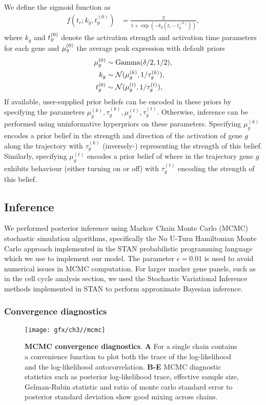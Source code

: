 We define the sigmoid function as
\begin{align}
	f(t_c;k_g,t^{(0)}_g) &= \frac{2}{1 + \exp\left(-k_g(t_c - t^{(0)}_g)\right)},
\end{align}
where $k_g$ and $t^{(0)}_g$ denote the activation strength and activation time parameters for each gene and $\mu^{(0)}_g$ the average peak expression
with default priors
\begin{align}
		\mu^{(0)}_g & \sim \mathrm{Gamma}(\delta / 2, 1 / 2), \\
		k_g & \sim \mathcal{N}(\mu^{(k)}_g, 1 / \tau^{(k)}_g), \\
		t^{(0)}_g & \sim \mathcal{N}(\mu^{(t)}_g, 1 / \tau^{(t)}_g),
\end{align}
If available, user-supplied prior beliefs can be encoded in these priors by specifying the parameters $\mu^{(k)}_g, \tau^{(k)}_g, \mu^{(t)}_g, \tau^{(t)}_g$. Otherwise, inference can be performed using uninformative hyperpriors on these parameters. Specifying $\mu^{(k)}_g$ encodes a prior belief in the strength and direction of the activation of gene $g$ along the trajectory with $\tau^{(k)}_g$ (inversely-) representing the strength of this belief. Similarly, specifying $\mu^{(t)}_g$ encodes a prior belief of where in the trajectory gene $g$ exhibits behaviour (either turning on or off) with $\tau^{(t)}_g$ encoding the strength of this belief.

\subsection{Inference}

We performed posterior inference using Markov Chain Monte Carlo (MCMC) stochastic simulation algorithms, specifically the No U-Turn Hamiltonian Monte Carlo approach \cite{homan2014no} implemented in the STAN probabilistic programming language \cite{carpenter2015stan} which we use to implement our model. The parameter $\epsilon = 0.01$ is used to avoid numerical issues in MCMC computation. For larger marker gene panels, such as in the cell cycle analysis section, we used the Stochastic Variational Inference methods implemented in STAN to perform approximate Bayesian inference.




\subsubsection{Convergence diagnostics}

\begin{figure}
\centering
 \texttt{[image: gfx/ch3//mcmc]}
 \caption{\textbf{MCMC convergence diagnostics}. \textbf{A} For a single chain \sname contains a convenience function to plot both the trace of the log-likelihood and the log-likelihood autocorrelation. \textbf{B-E} MCMC diagnostic statistics such as posterior log-likelihood trace, effective sample size, Gelman-Rubin statistic and ratio of monte carlo standard error to posterior standard deviation show good mixing across chains.} \label{fig:mcmc}
 \end{figure}

